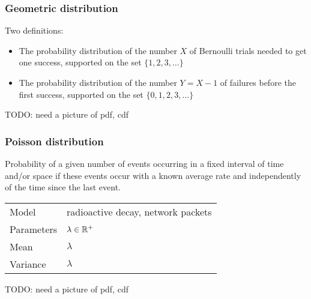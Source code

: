 \documentclass[t]{beamer}
\begin{document}
\begin{frame}
  \frametitle{Geometric distribution}

  Two definitions:
  \begin{itemize}
  \item The probability distribution of the number $X$ of Bernoulli
    trials needed to get one success, supported on the set $\{1, 2, 3,
    \dotsc \}$
  \item The probability distribution of the number $Y = X - 1$ of
    failures before the first success, supported on the set $\{ 0, 1,
    2, 3, \dotsc \}$
  \end{itemize}

  \only<2>{
    \begin{tabular}{ll}
      Model & \dots \\[1mm]
      Parameters & $p\in (0, 1]$ \\[1mm]
      Mean & $\frac 1p$ or $\frac{1-p}{p}$ \\[1mm]
      Variance & $\frac{1-p}{p^2}$
    \end{tabular}
    
  }

  TODO: need a picture of pdf, cdf
  
    
\end{frame}


\begin{frame}
  \frametitle{Poisson distribution}

  Probability of a given number of events occurring in a fixed
  interval of time and/or space if these events occur with a known
  average rate and independently of the time since the last event.
  \bigskip
  
  \begin{tabular}{ll}
    Model & radioactive decay, network packets\\[1mm]
    Parameters & $\lambda\in \mathbb{R}^+$\\[1mm]
    Mean & $\lambda$\\[1mm]
    Variance & $\lambda$
  \end{tabular}

  TODO: need a picture of pdf, cdf
  
  
\end{frame}
\end{document}
